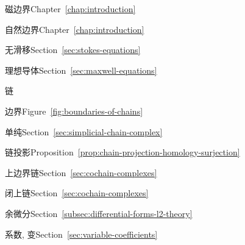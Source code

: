 \begin{theindex}
\subitem {}\label{index:boundary-conditions-magnetic}{磁边界}\quad Chapter~\ref{chap:introduction}

\subitem {}\label{index:boundary-conditions-natural}{自然边界}\quad Chapter~\ref{chap:introduction}

\subitem {}\label{index:boundary-conditions-no-slip}{无滑移}\quad Section~\ref{sec:stokes-equations}

\subitem {}\label{index:boundary-conditions-perfect-conductor}{理想导体}\quad Section~\ref{sec:maxwell-equations}

\item {}\label{index:chain}{链}

\subitem {}\label{index:chain-boundary-of}{边界}\quad Figure~\ref{fig:boundaries-of-chains}

\subitem {}\label{index:chain-simplicial}{单纯}\quad Section~\ref{sec:simplicial-chain-complex}

\item {}\label{index:chain-projection}{链投影}\quad Proposition~\ref{prop:chain-projection-homology-surjection}

\item {}\label{index:coboundary}{上边界链}\quad Section~\ref{sec:cochain-complexes}

\item {}\label{index:cocycle}{闭上链}\quad Section~\ref{sec:cochain-complexes}

\item {}\label{index:codifferential}{余微分}\quad Section~\ref{subsec:differential-forms-l2-theory}

\item {}\label{index:coefficients-variable}{系数, 变}\quad Section~\ref{sec:variable-coefficients}


\end{theindex}

